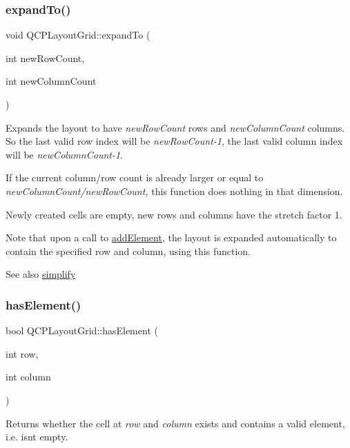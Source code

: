\subsubsection{\texorpdfstring{expand\+To()}{expandTo()}}
{\footnotesize\ttfamily void Q\+C\+P\+Layout\+Grid\+::expand\+To (\begin{DoxyParamCaption}\item[{int}]{new\+Row\+Count,  }\item[{int}]{new\+Column\+Count }\end{DoxyParamCaption})}

Expands the layout to have {\itshape new\+Row\+Count} rows and {\itshape new\+Column\+Count} columns. So the last valid row index will be {\itshape new\+Row\+Count-\/1}, the last valid column index will be {\itshape new\+Column\+Count-\/1}.

If the current column/row count is already larger or equal to {\itshape new\+Column\+Count/{\itshape new\+Row\+Count},} this function does nothing in that dimension.

Newly created cells are empty, new rows and columns have the stretch factor 1.

Note that upon a call to \hyperlink{class_q_c_p_layout_grid_adff1a2ca691ed83d2d24a4cd1fe17012}{add\+Element}, the layout is expanded automatically to contain the specified row and column, using this function.

\begin{DoxySeeAlso}{See also}
\hyperlink{class_q_c_p_layout_grid_a38621ca7aa633b6a9a88617df7f08672}{simplify} 
\end{DoxySeeAlso}
\mbox{\label{class_q_c_p_layout_grid_ab0cf4f7edc9414a3bfaddac0f46dc0a0}} 
\subsubsection{\texorpdfstring{has\+Element()}{hasElement()}}
{\footnotesize\ttfamily bool Q\+C\+P\+Layout\+Grid\+::has\+Element (\begin{DoxyParamCaption}\item[{int}]{row,  }\item[{int}]{column }\end{DoxyParamCaption})}

Returns whether the cell at {\itshape row} and {\itshape column} exists and contains a valid element, i.\+e. isn\textquotesingle{}t empty.

